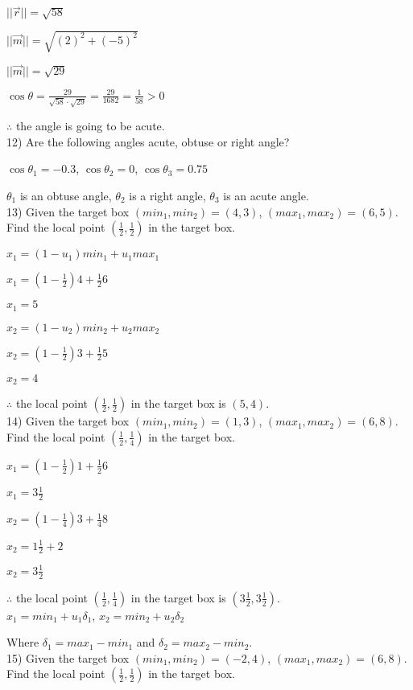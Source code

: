\documentclass[a4paper]{article}
\begin{document}
$||\vec{r}|| = \sqrt{58}$

$||\vec{m}|| = \sqrt{(2)^2 + (-5)^2}$

$||\vec{m}|| = \sqrt{29}$

$\cos\theta = \frac{29}{\sqrt{58}\cdot\sqrt{29}} = \frac{29}{1682} = \frac{1}{58} > 0$

$\therefore$ the angle is going to be acute.\\

12) Are the following angles acute, obtuse or right angle?

$\cos\theta_1 = -0.3$, $\cos\theta_2 = 0$, $\cos\theta_3 = 0.75$

$\theta_1$ is an obtuse angle, $\theta_2$ is a right angle, $\theta_3$ is an acute angle.\\

13) Given the target box $(min_1, min_2) = (4,3)$, $(max_1, max_2) = (6,5)$. Find the local point $(\frac{1}{2}, \frac{1}{2})$ in the target box.

$x_1 = (1 - u_1)min_1 + u_1max_1$

$x_1 = (1 - \frac{1}{2})4 + \frac{1}{2}6$

$x_1 = 5$

$x_2 = (1-u_2)min_2 + u_2max_2$

$x_2 = (1-\frac{1}{2})3+\frac{1}{2}5$

$x_2 = 4$

$\therefore$ the local point $(\frac{1}{2},\frac{1}{2})$ in the target box is $(5,4)$.\\

14) Given the target box $(min_1, min_2) = (1,3)$, $(max_1, max_2) = (6,8)$. Find the local point $(\frac{1}{2},\frac{1}{4})$ in the target box.

$x_1 = (1 - \frac{1}{2})1+\frac{1}{2}6$

$x_1 = 3\frac{1}{2}$

$x_2 = (1-\frac{1}{4})3+\frac{1}{4}8$

$x_2 = 1\frac{1}{2}+2$

$x_2 = 3\frac{1}{2}$

$\therefore$ the local point $(\frac{1}{2},\frac{1}{4})$ in the target box is $(3\frac{1}{2}, 3\frac{1}{2})$.\\

$x_1 = min_1+u_1\delta_1$, $x_2 = min_2+u_2\delta_2$

Where $\delta_1 = max_1 - min_1$ and $\delta_2 = max_2 - min_2$.\\

15) Given the target box $(min_1, min_2) = (-2,4)$, $(max_1, max_2) = (6, 8)$. Find the local point $(\frac{1}{2}, \frac{1}{2})$ in the target box.
\end{document}
